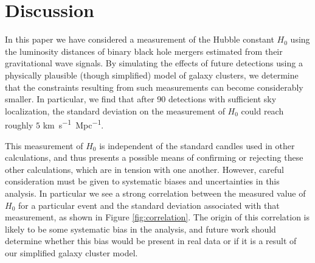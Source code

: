 \section{Discussion} \label{sec:conclusions}

In this paper we have considered a measurement of the Hubble constant $H_0$ using the luminosity distances of binary black hole mergers estimated from their gravitational wave signals.
By simulating the effects of future detections using a physically plausible (though simplified) model of galaxy clusters, we determine that the constraints resulting from such measurements can become considerably smaller.
In particular, we find that after 90 detections with sufficient sky localization, the standard deviation on the measurement of $H_0$ could reach roughly $5$ \si{km.s^{-1}.Mpc^{-1}}.

This measurement of $H_0$ is independent of the standard candles used in other calculations, and thus presents a possible means of confirming or rejecting these other calculations, which are in tension with one another.
However, careful consideration must be given to systematic biases and uncertainties in this analysis.
In particular we see a strong correlation between the measured value of $H_0$ for a particular event and the standard deviation associated with that measurement, as shown in Figure \ref{fig:correlation}.
The origin of this correlation is likely to be some systematic bias in the analysis, and future work should determine whether this bias would be present in real data or if it is a result of our simplified galaxy cluster model.




